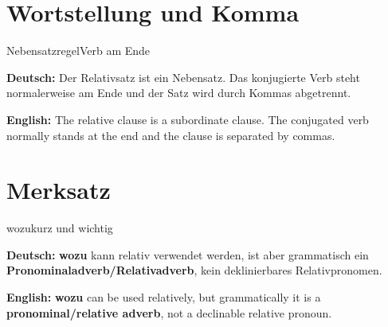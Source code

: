 \documentclass[a4paper,11pt]{article}
\newcommand{\GermanText}[1]{\textbf{Deutsch: }#1\par}
\newcommand{\EnglishText}[1]{{\small\color{SoftGray}\textbf{English: }#1\par}}
\begin{document}
\section{Wortstellung und Komma}

\begin{grammarentry}{Nebensatzregel}{Verb am Ende}

\GermanText{Der Relativsatz ist ein Nebensatz. Das konjugierte Verb steht normalerweise am Ende und der Satz wird durch Kommas abgetrennt.}

\EnglishText{The relative clause is a subordinate clause. The conjugated verb normally stands at the end and the clause is separated by commas.}

\end{grammarentry}

\section{Merksatz}

\begin{grammarentry}{wozu}{kurz und wichtig}

\GermanText{\textbf{wozu} kann relativ verwendet werden, ist aber grammatisch ein \textbf{Pronominaladverb/Relativadverb}, kein deklinierbares Relativpronomen.}

\EnglishText{\textbf{wozu} can be used relatively, but grammatically it is a \textbf{pronominal/relative adverb}, not a declinable relative pronoun.}

\end{grammarentry}
\end{document}
